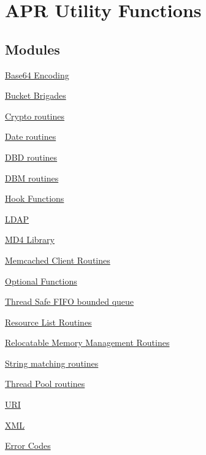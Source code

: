 \hypertarget{group___a_p_r___util}{\section{A\-P\-R Utility Functions}
\label{group___a_p_r___util}
}
\subsection*{Modules}
\begin{DoxyCompactItemize}
\item 
\hyperlink{group___a_p_r___util___base64}{Base64 Encoding}
\item 
\hyperlink{group___a_p_r___util___bucket___brigades}{Bucket Brigades}
\item 
\hyperlink{group___a_p_r___util___crypto}{Crypto routines}
\item 
\hyperlink{group___a_p_r___util___date}{Date routines}
\item 
\hyperlink{group___a_p_r___util___d_b_d}{D\-B\-D routines}
\item 
\hyperlink{group___a_p_r___util___d_b_m}{D\-B\-M routines}
\item 
\hyperlink{group___a_p_r___util___hook}{Hook Functions}
\item 
\hyperlink{group___a_p_r___util___l_d_a_p}{L\-D\-A\-P}
\item 
\hyperlink{group___a_p_r___util___m_d4}{M\-D4 Library}
\item 
\hyperlink{group___a_p_r___util___m_c}{Memcached Client Routines}
\item 
\hyperlink{group___a_p_r___util___opt}{Optional Functions}
\item 
\hyperlink{group___a_p_r___util___f_i_f_o}{Thread Safe F\-I\-F\-O bounded queue}
\item 
\hyperlink{group___a_p_r___util___r_l}{Resource List Routines}
\item 
\hyperlink{group___a_p_r___util___r_m_m}{Relocatable Memory Management Routines}
\item 
\hyperlink{group___a_p_r___util___str_match}{String matching routines}
\item 
\hyperlink{group___a_p_r___util___t_p}{Thread Pool routines}
\item 
\hyperlink{group___a_p_r___util___u_r_i}{U\-R\-I}
\item 
\hyperlink{group___a_p_r___util___x_m_l}{X\-M\-L}
\item 
\hyperlink{group__apu__errno}{Error Codes}
\end{DoxyCompactItemize}
